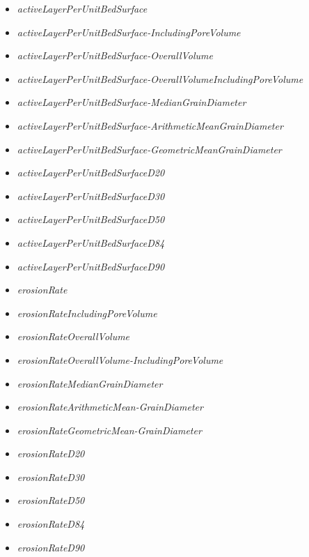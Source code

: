 \documentclass[11pt,a4paper]{article}
\begin{document}
\begin{multicols}{2}
\begin{itemize}
	\item \emph{activeLayerPerUnitBedSurface}
	\item \emph{activeLayerPerUnitBedSurface-}\emph{IncludingPoreVolume}
	\item \emph{activeLayerPerUnitBedSurface-}\emph{OverallVolume}
	\item \emph{activeLayerPerUnitBedSurface-}\emph{OverallVolumeIncludingPoreVolume}
	\item \emph{activeLayerPerUnitBedSurface-}\emph{MedianGrainDiameter}
	\item \emph{activeLayerPerUnitBedSurface-}\emph{ArithmeticMeanGrainDiameter}
	\item \emph{activeLayerPerUnitBedSurface-}\emph{GeometricMeanGrainDiameter}
	\item \emph{activeLayerPerUnitBedSurfaceD20}
	\item \emph{activeLayerPerUnitBedSurfaceD30}
	\item \emph{activeLayerPerUnitBedSurfaceD50}
	\item \emph{activeLayerPerUnitBedSurfaceD84}
	\item \emph{activeLayerPerUnitBedSurfaceD90}
\end{itemize}
\end{multicols}
\vspace{3ex}
\begin{multicols}{2}
\begin{itemize}
	\item \emph{erosionRate}
	\item \emph{erosionRateIncludingPoreVolume}
	\item \emph{erosionRateOverallVolume}
	\item \emph{erosionRateOverallVolume-}\emph{IncludingPoreVolume}
	\item \emph{erosionRateMedianGrainDiameter}
	\item \emph{erosionRateArithmeticMean-}\emph{GrainDiameter}
	\item \emph{erosionRateGeometricMean-}\emph{GrainDiameter}
	\item \emph{erosionRateD20}
	\item \emph{erosionRateD30}
	\item \emph{erosionRateD50}
	\item \emph{erosionRateD84}
	\item \emph{erosionRateD90}
\end{itemize}
\end{multicols}
\end{document}
